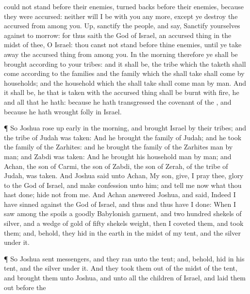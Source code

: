 {could not
stand
before their
enemies,
{}
turned
{}
backs
before their
enemies, because they were
accursed: neither will I be with you any
more,
except ye
destroy the
accursed from
among you.
Up,
sanctify the
people, and
say,
Sanctify yourselves against to
morrow: for thus
saith the
{}
God of
Israel,
{} an accursed
thing in the
midst of thee, O
Israel: thou
canst not
stand
before thine
enemies, until ye take
away the accursed
thing from
among you.
In the
morning therefore ye shall be
brought according to your
tribes: and it shall be,
{} the
tribe which the
{}
taketh shall
come according to the
families
{} and the
family which the
{} shall
take shall
come by
households; and the
household which the
{} shall
take shall
come
man by
man.
And it shall be,
{} he that is
taken with the accursed
thing shall be
burnt with
fire, he and all that he hath: because he hath
transgressed the
covenant of the
{}, and because he hath
wrought
folly in
Israel.
\par }{\PP {}¶ So
Joshua rose up
early in the
morning, and
brought
Israel by their
tribes; and the
tribe of
Judah was
taken:
And he
brought the
family of
Judah; and he
took the
family of the
Zarhites: and he
brought the
family of the
Zarhites
man by
man; and
Zabdi was
taken:
And he
brought his
household
man by
man; and
Achan, the
son of
Carmi, the
son of
Zabdi, the
son of
Zerah, of the
tribe of
Judah, was
taken.
And
Joshua
said unto
Achan, My
son,
give, I pray thee,
glory to the
{}
God of
Israel, and
make
confession unto him; and
tell me now what thou hast
done;
hide
{} not from me.
And
Achan
answered
Joshua, and
said,
Indeed I have
sinned against the
{}
God of
Israel, and thus and thus have I
done:
When I
saw among the
spoils
a
goodly
Babylonish
garment, and two
hundred
shekels of
silver, and
a
wedge of
gold of
fifty
shekels
weight, then I
coveted them, and
took them; and, behold, they
{}
hid in the
earth in the
midst of my
tent, and the
silver under it.
\par }{\PP {}¶ So
Joshua
sent
messengers, and they
ran unto the
tent; and, behold,
{}
hid in his
tent, and the
silver under it.
And they
took them out of the
midst of the
tent, and
brought them unto
Joshua, and unto all the
children of
Israel, and laid them
out
before the
}
